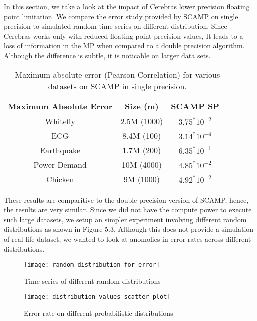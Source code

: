 In this section, we take a look at the impact of Cerebras lower precision floating point limitation. We compare the error study provided by SCAMP on single precision \cite{4} to simulated random time series on different distribution.
Since Cerebras works only with reduced floating point precision values, It leads to a loss of information in the MP when compared to a double precision algorithm. Although the difference is subtle, it is noticable on larger data sets.
\clearpage
\begin{table}[h!]
    \centering
    \caption{Maximum absolute error (Pearson Correlation) for various datasets on SCAMP in single precision. \cite{4}\\}
    \begin{tabular}{c c c c} 
     \hline
     Maximum Absolute Error & Size (m) & SCAMP SP \\ [0.5ex] 
     \hline
     Whitefly & 2.5M (1000) & $3.75^*10^{-2}$ \\ [1ex]
     \hline
     ECG & 8.4M (100) & $3.14^*10^{-4}$ \\ [1ex] 
     \hline
     Earthquake & 1.7M (200) & $6.35^*10^{-1}$ \\ [1ex] 
     \hline
     Power Demand & 10M (4000) & $4.85^*10^{-2}$ \\ [1ex] 
     \hline
     Chicken & 9M (1000) & $4.92^*10^{-2}$ \\ [1ex] 
     \hline
    \end{tabular}
\end{table}

These results are comparitive to the double precision version of SCAMP, hence, the results are very similar. Since we did not have the compute power to execute such large datasets, we setup an simpler experiment involving different random distributions as shown in Figure 5.3. Although this does not provide a simulation of real life dataset, we wanted to look at anomolies in error rates across different distributions.

\begin{figure}[h!]
    \texttt{[image: random\_distribution\_for\_error]}
    \centering
    \caption{Time series of different random distributions}
\end{figure}


\begin{figure}[h!]
    \texttt{[image: distribution\_values\_scatter\_plot]}
    \centering
    \caption{Error rate on different probabilistic distributions}
\end{figure}

